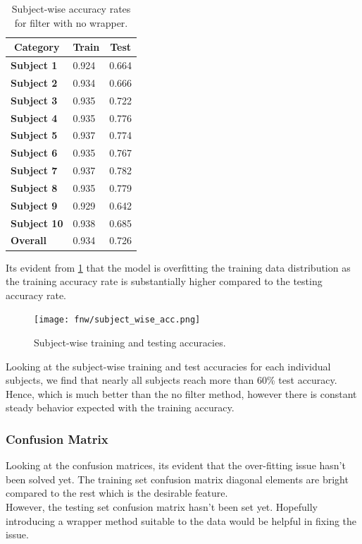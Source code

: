 \documentclass[12pt,twoside,a4paper]{article}
\begin{document}
\begin{table}[H]
\centering
\begin{tabular}{|l|l|l|}
\hline
\multicolumn{1}{|c|}{\textbf{Category}} & \multicolumn{1}{c|}{\textbf{Train}} & \multicolumn{1}{c|}{\textbf{Test}} \\ \hline
\textbf{Subject 1}  & 0.924 & 0.664 \\ \hline
\textbf{Subject 2}  & 0.934 & 0.666 \\ \hline
\textbf{Subject 3}  & 0.935 & 0.722 \\ \hline
\textbf{Subject 4}  & 0.935 & 0.776 \\ \hline
\textbf{Subject 5}  & 0.937 & 0.774 \\ \hline
\textbf{Subject 6}  & 0.935 & 0.767 \\ \hline
\textbf{Subject 7}  & 0.937 & 0.782 \\ \hline
\textbf{Subject 8}  & 0.935 & 0.779 \\ \hline
\textbf{Subject 9}  & 0.929 & 0.642 \\ \hline
\textbf{Subject 10} & 0.938 & 0.685 \\ \hline
\textbf{Overall}    & 0.934 & 0.726 \\ \hline
\end{tabular}
\caption{Subject-wise accuracy rates for filter with no wrapper.}
\label{tab:FNWT}
\end{table}

Its evident from \ref{tab:FNWT} that the model is overfitting the training data distribution as the training accuracy rate is substantially higher compared to the testing accuracy rate.

\begin{figure}[H]
    \centering
    \texttt{[image: fnw/subject\_wise\_acc.png]}
    \caption{Subject-wise training and testing accuracies.}
    \label{fig: F3}
\end{figure}

Looking at the subject-wise training and test accuracies for each individual subjects, we find that nearly all subjects reach more than 60\% test accuracy. Hence, which is much better than the no filter method, however there is constant steady behavior expected with the training accuracy.

\subsubsection*{Confusion Matrix}

Looking at the confusion matrices, its evident that the over-fitting issue hasn't been solved yet. The training set confusion matrix diagonal elements are bright compared to the rest which is the desirable feature. \\
However, the testing set confusion matrix hasn't been set yet. Hopefully introducing a wrapper method suitable to the data would be helpful in fixing the issue.
\end{document}
